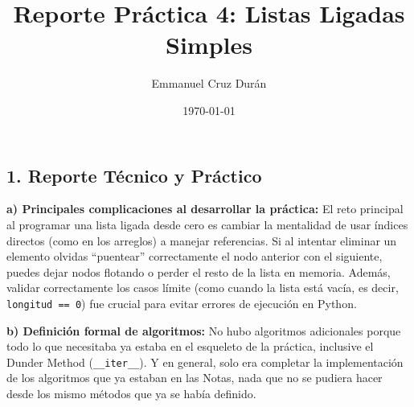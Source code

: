 \documentclass[12pt, letterpaper]{article}
\title{Reporte Práctica 4: Listas Ligadas Simples}
\author{Emmanuel Cruz Durán}
\date{\today}
\begin{document}
\maketitle 

\subsection*{1. Reporte Técnico y Práctico}

\textbf{a) Principales complicaciones al desarrollar la práctica:}
El reto principal al programar una lista ligada desde cero es cambiar la mentalidad de usar índices directos (como en los arreglos) a manejar referencias. Si al intentar eliminar un elemento olvidas ``puentear'' correctamente el nodo anterior con el siguiente, puedes dejar nodos flotando o perder el resto de la lista en memoria. Además, validar correctamente los casos límite (como cuando la lista está vacía, es decir, \texttt{longitud == 0}) fue crucial para evitar errores de ejecución en Python.

\textbf{b) Definición formal de algoritmos:}
No hubo algoritmos adicionales porque todo lo que necesitaba ya estaba en el esqueleto de la práctica, inclusive el Dunder Method (\texttt{\_\_iter\_\_}).
Y en general, solo era completar la implementación de los algoritmos que ya estaban en las Notas, nada que no se pudiera hacer desde los mismo métodos que ya se había definido.
\end{document}
